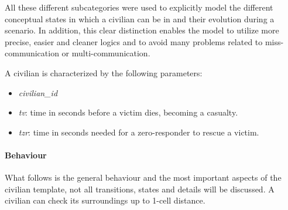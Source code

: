 \noindent
All these different subcategories were used to explicitly model the different conceptual states in which a civilian can be in and their evolution during a scenario. In addition, this clear distinction enables the model to utilize more precise, easier and cleaner logics and to avoid many problems related to miss-communication or multi-communication.\newline

\noindent
A civilian is characterized by the following parameters:
\begin{itemize}
	\item \textit{civilian\_id}
	\item \textit{tv}: time in seconds before a victim dies, becoming a casualty.
	\item \textit{tzr}: time in seconds needed for a zero-responder to rescue a victim.
\end{itemize}

\paragraph{Behaviour}
What follows is the general behaviour and the most important aspects of the civilian template, not all transitions, states and details will be discussed.\newline
A civilian can check its surroundings up to 1-cell distance.

